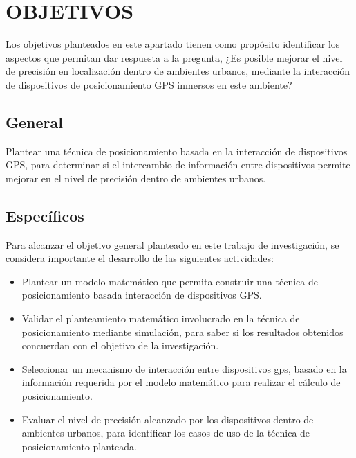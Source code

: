 \chapter{OBJETIVOS} 
\label{sec:objetivos}

Los objetivos planteados en este apartado tienen como propósito identificar los aspectos que permitan dar respuesta a la pregunta, ¿Es posible mejorar el nivel de precisión en localización dentro de ambientes urbanos, mediante la interacción de dispositivos de posicionamiento GPS inmersos en este ambiente?

\section{General}
Plantear una técnica de posicionamiento basada en la interacción de dispositivos GPS, para determinar si el intercambio de información entre dispositivos permite mejorar en el nivel de precisión dentro de ambientes urbanos.



\section{Específicos}

Para alcanzar el objetivo general planteado en este trabajo de investigación, se considera importante el desarrollo de las siguientes actividades:

\begin{itemize}

\item Plantear un modelo matemático que permita construir una técnica de posicionamiento basada interacción de dispositivos GPS.

\item Validar el planteamiento matemático involucrado en la técnica de posicionamiento mediante simulación, para saber si los resultados obtenidos concuerdan con el objetivo de la investigación.

\item Seleccionar un mecanismo de interacción entre dispositivos gps, basado en la información requerida por el modelo matemático para realizar el cálculo de posicionamiento.

\item Evaluar el nivel de precisión alcanzado por los dispositivos dentro de ambientes urbanos, para identificar los casos de uso de la técnica de posicionamiento planteada.

\end{itemize}



